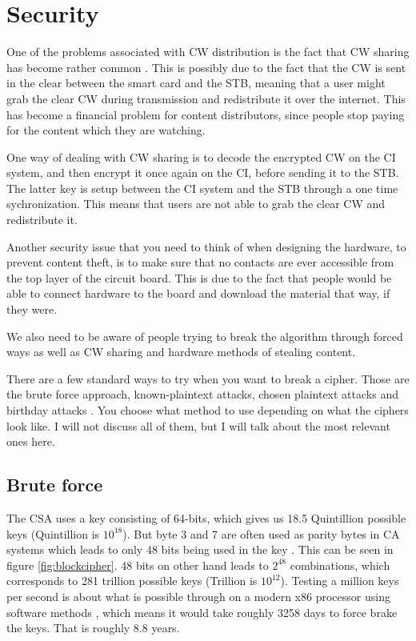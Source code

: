 \section{Security}
One of the problems associated with CW distribution is the fact that CW sharing 
has become rather common \citep{Farncombe}. This is possibly due to the fact that
the CW is sent in the clear between the smart card and the STB, meaning that a 
user might grab the clear CW during transmission and redistribute it over the 
internet. This has become a financial problem for content distributors, since 
people stop paying for the content which they are watching.

One way of dealing with CW sharing is to decode the encrypted CW on the CI 
system, and then encrypt it once again on the CI, before sending it to the STB. 
The latter key is setup between the CI system and the STB  through a one time
sychronization. This means that users are not able to grab the clear CW and 
redistribute it. \citep[pp. 12--13]{HIS:2011}

Another security issue that you need to think of when designing the hardware, to 
prevent content theft, is to make sure that no contacts are ever accessible from 
the top layer of the circuit board. This is due to the fact that people would be 
able to connect hardware to the board and download the material that way, if they
were. 

We also need to be aware of people trying to break the algorithm through forced 
ways as well as CW sharing and hardware methods of stealing content.

There are a few standard ways to try when you want to break a cipher. 
Those are the brute force approach, known-plaintext attacks, chosen plaintext 
attacks and birthday attacks \citep[pp. 31-34]{Schneier:2003}. You choose what 
method to use depending on what the ciphers look like. I will not discuss all 
of them, but I will talk about the most relevant ones here.

\subsection{Brute force}
The CSA uses a key consisting of 64-bits, which gives us 18.5 Quintillion 
possible keys (Quintillion is $10^{18}$). But byte 3 and 7 are often used as 
parity bytes in CA systems which leads to only 48 bits being used in the key 
\citep{Breaking:2012}. This can be seen in figure \ref{fig:blockcipher}. 48 bits 
on other hand leads to $2^{48}$ combinations, which corresponds to 281 trillion 
possible keys (Trillion is $10^{12}$). Testing a million keys per second is about 
what is possible through on a modern x86 processor using software methods
, which means it would take roughly 
3258 days to force brake the keys. That is roughly 8.8 years.

